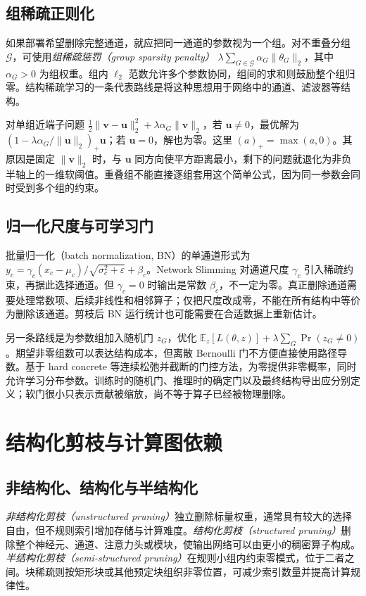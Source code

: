\documentclass[UTF8,12pt,a4paper,fontset=fandol]{ctexart}
\begin{document}
\subsection{组稀疏正则化}
如果部署希望删除完整通道，就应把同一通道的参数视为一个组。对不重叠分组 $\mathcal G$，可使用\emph{组稀疏惩罚（group sparsity penalty）} $\lambda\sum_{G\in\mathcal G}\alpha_G\|\theta_G\|_2$，其中 $\alpha_G>0$ 为组权重。组内 $\ell_2$ 范数允许多个参数协同，组间的求和则鼓励整个组归零。结构稀疏学习的一条代表路线是将这种思想用于网络中的通道、滤波器等结构\cite{wen2016}。

对单组近端子问题 $\tfrac12\|\mathbf v-\mathbf u\|_2^2+\lambda\alpha_G\|\mathbf v\|_2$，若 $\mathbf u\ne0$，最优解为 $(1-\lambda\alpha_G/\|\mathbf u\|_2)_+\mathbf u$；若 $\mathbf u=0$，解也为零。这里 $(a)_+=\max(a,0)$。其原因是固定 $\|\mathbf v\|_2$ 时，与 $\mathbf u$ 同方向使平方距离最小，剩下的问题就退化为非负半轴上的一维软阈值。重叠组不能直接逐组套用这个简单公式，因为同一参数会同时受到多个组的约束。

\subsection{归一化尺度与可学习门}
批量归一化（batch normalization, BN）的单通道形式为 $y_c=\gamma_c(x_c-\mu_c)/\sqrt{\sigma_c^2+\varepsilon}+\beta_c$。Network Slimming 对通道尺度 $\gamma_c$ 引入稀疏约束，再据此选择通道\cite{liu2017}。但 $\gamma_c=0$ 时输出是常数 $\beta_c$，不一定为零。真正删除通道需要处理常数项、后续非线性和相邻算子；仅把尺度改成零，不能在所有结构中等价为删除该通道。剪枝后 BN 运行统计也可能需要在合适数据上重新估计。

另一条路线是为参数组加入随机门 $z_G$，优化 $\mathbb E_z[L(\theta,z)]+\lambda\sum_G\Pr(z_G\ne0)$。期望非零组数可以表达结构成本，但离散 Bernoulli 门不方便直接使用路径导数。基于 hard concrete 等连续松弛并截断的门控方法，为零提供非零概率，同时允许学习分布参数\cite{louizos2018}。训练时的随机门、推理时的确定门以及最终结构导出应分别定义；软门很小只表示贡献被缩放，尚不等于算子已经被物理删除。

\section{结构化剪枝与计算图依赖}
\label{sec:prune-structured}

\subsection{非结构化、结构化与半结构化}
\emph{非结构化剪枝（unstructured pruning）}独立删除标量权重，通常具有较大的选择自由，但不规则索引增加存储与计算难度。\emph{结构化剪枝（structured pruning）}删除整个神经元、通道、注意力头或模块，使输出网络可以由更小的稠密算子构成。\emph{半结构化剪枝（semi-structured pruning）}在规则小组内约束零模式，位于二者之间。块稀疏则按矩形块或其他预定块组织非零位置，可减少索引数量并提高计算规律性。
\end{document}
